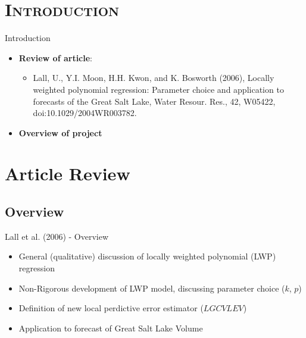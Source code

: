 \documentclass[xcolor=x11names,compress]{beamer}
\renewcommand{\(}{\begin{columns}}
\renewcommand{\)}{\end{columns}}
\newcommand{\<}[1]{\begin{column}{#1}}
\renewcommand{\>}{\end{column}}
\begin{document}
\section{\scshape Introduction}

\begin{frame}{Introduction}
\begin{itemize}
\item {\bf Review of article}:

\begin{itemize}
\item Lall, U., Y.I. Moon, H.H. Kwon, and K. Bosworth (2006), Locally weighted polynomial regression: Parameter choice and application to forecasts of the Great Salt Lake, Water Resour. Res., 42, W05422, doi:10.1029/2004WR003782.
\end{itemize}

\item \bf Overview of project
\end{itemize}
\end{frame}

\section{Article Review}
\subsection{Overview}
\begin{frame}{Lall et al. (2006) - Overview}

\begin{itemize}
\item General (qualitative) discussion of locally weighted polynomial (LWP) regression
\pause
\item Non-Rigorous development of LWP model, discussing parameter choice ($k$, $p$)
\pause
\item Definition of new local perdictive error estimator ($LGCVLEV$)
\pause
\item Application to forecast of Great Salt Lake Volume
\end{itemize}

\end{frame}
\end{document}
